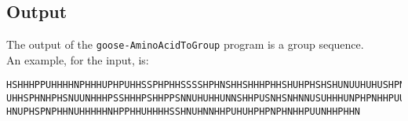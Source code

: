 \subsection*{Output}

The output of the \texttt{goose-AminoAcidToGroup} program is a group sequence.\\
An example, for the input, is:
\begin{lstlisting}
HSHHHPPUHHHHNPHHHUPHPUHHSSPHPHHSSSSHPHNSHHSHHHPHHSHUHPHSHSHUNUUHUHUSHPNHUHUSUUHS
UHHSPHNHPHSNUUNHHHPSSHHHPSHHPPSNNUHUHHUNNSHHPUSNHSNHNNUSUHHHUNPHPNHHPUUUSPHHHSUH
HNUPHSPNPHHNUHHHHHNHPPHHUHHHHSSHNUHNNHHPUHUHPHPNPHNHHPUUNHHPHHN
\end{lstlisting}
